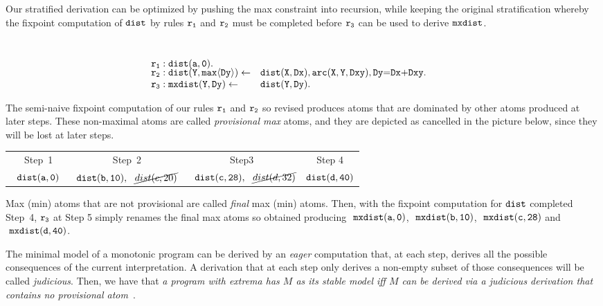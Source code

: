 \documentclass[11pt]{article}
\def\mt{\tt}
\newcommand{\bldl}{\smallskip\[\begin{array}{ll}}
\newcommand{\eldl}{\end{array}\]\rm}
\newcommand{\prule}[2]{ \mt #1 \leftarrow & \mt #2 \\}
\newcommand{\pfact}[2]{ \mt  #1 &  \mt #2 \\}
\def\inv{\vspace{-0.2cm}}
\def\sinv{\vspace{-0.1cm}}
\def\inv{\vspace{-0.2cm}}
\def\sinv{\vspace{-0.1cm}}
\def\rof#1{$\tt r_{#1}$}
\def\f--{\tt{ \_\!\_\;}}
\begin{document}
 
 Our stratified derivation can be optimized by pushing  the max constraint into recursion, while keeping the
 original stratification whereby the fixpoint computation of $\tt dist$ by rules $\tt r_1$ and $\tt r_2$ must be completed
 before  $\tt r_3$ can be used to derive $\tt mxdist$. 


\inv\begin{example} ~\\[-0.4cm]
\label{ex:premopt}
    \bldl
 \sinv  \pfact{r_1: dist(a, 0).}{ }
   \prule{r_2: dist(Y,  max \langle Dy \rangle)}{dist(X, Dx), arc(X, Y,  Dxy),  Dy{=}Dx{+}Dxy.~~~~~~~~~}
    \prule{r_3: mxdist(Y,   Dy )}{dist(Y, Dy).}
   \eldl
 \end{example}
 
\sinv  The semi-naive fixpoint computation  of our rules \rof{1} and \rof{2} so revised
produces atoms that are dominated by other atoms produced at later steps.
These non-maximal atoms are called  {\em provisional max} atoms, and they are depicted  as cancelled
in the picture below, since they will be lost at later steps.

\sinv\begin{center}

\begin{tabular}{|c  |c | c | c |}
\hline
  Step~1 & Step~2  &  Step3 &  Step 4 \\
$\tt ~~dist(a, 0)~~$ & $\tt dist(b, 10), ~~\cancel{dist(c, 20)} $ &$\tt  ~~dist(c, 28), ~~\cancel{dist(d, 32)}$ & $\tt  dist(d, 40)$\\
\hline
\end{tabular}
\end{center}
Max (min) atoms that are not provisional are called {\em final} max (min) atoms.
Then, with the fixpoint computation for $\tt dist$  completed Step~4,  \rof{3} at Step 5  simply renames  the final max atoms so obtained 
 producing
 $\tt ~mxdist(a, 0)$,  $\tt ~mxdist(b, 10)$,   $\tt ~mxdist(c, 28) $ and $\tt  ~mxdist(d, 40)$.

The minimal model of  a monotonic program can be derived by an  {\em eager} computation
that, at each step, derives all the possible consequences of the current interpretation. A derivation that at each step only
derives a non-empty subset of those consequences will be called {\it judicious}.  Then,  we have that
 {\it  a program with extrema has $M$ as its stable model  iff
$M$  can be derived via a judicious derivation that contains no provisional atom}~\cite{submitted}.  
\end{document}
